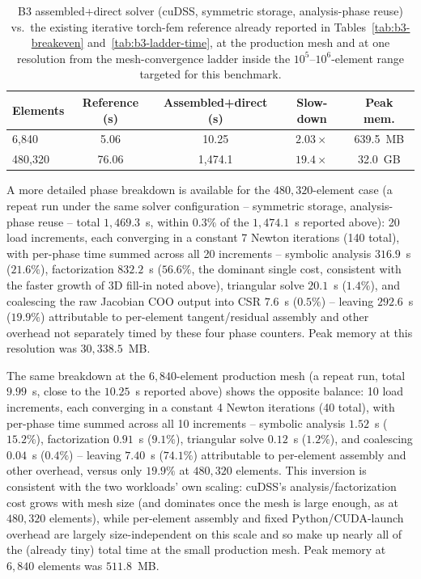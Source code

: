 \documentclass[final,5p,times]{elsarticle}
\begin{document}
\begin{table}[ht]
\centering
\caption{B3 assembled+direct solver (cuDSS, symmetric storage,
  analysis-phase reuse) vs.\ the existing iterative torch-fem reference
  already reported in Tables~\ref{tab:b3-breakeven}
  and~\ref{tab:b3-ladder-time}, at the production mesh and at one
  resolution from the mesh-convergence ladder inside the
  $10^5$--$10^6$-element range targeted for this benchmark.}
\label{tab:b3-assembled-direct}
\small
\begin{tabular}{lcccc}
\toprule
Elements & Reference (s) & Assembled+direct (s) & Slow-down & Peak mem. \\
\midrule
6{,}840   & 5.06  & 10.25     & $2.03\times$ & 639.5~MB \\
480{,}320 & 76.06 & 1{,}474.1 & $19.4\times$ & 32.0~GB \\
\bottomrule
\end{tabular}
\end{table}

A more detailed phase breakdown is available for the $480{,}320$-element
case (a repeat run under the same solver configuration -- symmetric
storage, analysis-phase reuse -- total $1{,}469.3$~s, within $0.3\%$ of
the $1{,}474.1$~s reported above): 20 load increments, each converging in
a constant 7 Newton iterations (140 total), with per-phase time summed
across all 20 increments -- symbolic analysis $316.9$~s ($21.6\%$),
factorization $832.2$~s ($56.6\%$, the dominant single cost, consistent
with the faster growth of 3D fill-in noted above), triangular solve
$20.1$~s ($1.4\%$), and coalescing the raw Jacobian COO output into CSR
$7.6$~s ($0.5\%$) -- leaving $292.6$~s ($19.9\%$) attributable to
per-element tangent/residual assembly and other overhead not separately
timed by these four phase counters. Peak memory at this resolution was
$30{,}338.5$~MB.

The same breakdown at the $6{,}840$-element production mesh (a repeat
run, total $9.99$~s, close to the $10.25$~s reported above) shows the
opposite balance: 10 load increments, each converging in a constant 4
Newton iterations (40 total), with per-phase time summed across all 10
increments -- symbolic analysis $1.52$~s ($15.2\%$), factorization
$0.91$~s ($9.1\%$), triangular solve $0.12$~s ($1.2\%$), and coalescing
$0.04$~s ($0.4\%$) -- leaving $7.40$~s ($74.1\%$) attributable to
per-element assembly and other overhead, versus only $19.9\%$ at
$480{,}320$ elements. This inversion is consistent with the two
workloads' own scaling: cuDSS's analysis/factorization cost grows with
mesh size (and dominates once the mesh is large enough, as at
$480{,}320$ elements), while per-element assembly and fixed
Python/CUDA-launch overhead are largely size-independent on this scale
and so make up nearly all of the (already tiny) total time at the
small production mesh. Peak memory at $6{,}840$ elements was
$511.8$~MB.
\end{document}
